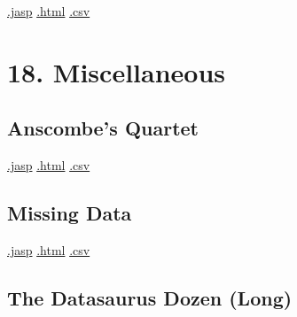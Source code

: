 \documentclass[
  letterpaper,
  DIV=11,
  numbers=noendperiod]{scrreprt}
\begin{document}
\textbar{}
\href{https://github.com/jasp-stats/jasp-data-library/raw/main/Larks\%20and\%20Owls/Larks\%20and\%20Owls.jasp}{.jasp}
\textbar{}
\href{https://htmlpreview.github.io/?https://github.com/jasp-stats/jasp-data-library/blob/main/Larks\%20and\%20Owls/index.html}{.html}
\textbar{}
\href{https://raw.githubusercontent.com/jasp-stats/jasp-data-library/main/Larks\%20and\%20Owls/Larks\%20and\%20Owls.csv}{.csv}


\hypertarget{miscellaneous}{%
\chapter{18. Miscellaneous}\label{miscellaneous}}

\hypertarget{anscombes-quartet}{%
\section{Anscombe's Quartet}\label{anscombes-quartet}}

\textbar{}
\href{https://github.com/jasp-stats/jasp-data-library/raw/main/Anscombe\textquotesingle{}s\%20Quartet/Anscombe\textquotesingle{}s\%20Quartet.jasp}{.jasp}
\textbar{}
\href{https://htmlpreview.github.io/?https://github.com/jasp-stats/jasp-data-library/blob/main/Anscombe\textquotesingle{}s\%20Quartet/index.html}{.html}
\textbar{}
\href{https://raw.githubusercontent.com/jasp-stats/jasp-data-library/main/Anscombe\textquotesingle{}s\%20Quartet/Anscombe\textquotesingle{}s\%20Quartet.csv}{.csv}

\hypertarget{missing-data}{%
\section{Missing Data}\label{missing-data}}

\textbar{}
\href{https://github.com/jasp-stats/jasp-data-library/raw/main/Missing\%20Data/Missing\%20Data.jasp}{.jasp}
\textbar{}
\href{https://htmlpreview.github.io/?https://github.com/jasp-stats/jasp-data-library/blob/main/Missing\%20Data/index.html}{.html}
\textbar{}
\href{https://raw.githubusercontent.com/jasp-stats/jasp-data-library/main/Missing\%20Data/Missing\%20Data.csv}{.csv}

\hypertarget{the-datasaurus-dozen-long}{%
\section{The Datasaurus Dozen (Long)}\label{the-datasaurus-dozen-long}}
\end{document}
